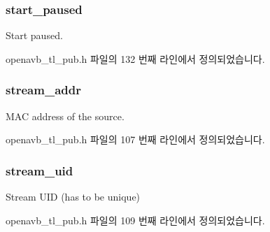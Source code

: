 \subsubsection[{\texorpdfstring{start\+\_\+paused}{start_paused}}]{ start\+\_\+paused}\hypertarget{structopenavb__tl__cfg__t_a0983af523b1f3fd4392c902ccf862905}{}\label{structopenavb__tl__cfg__t_a0983af523b1f3fd4392c902ccf862905}


Start paused. 



openavb\+\_\+tl\+\_\+pub.\+h 파일의 132 번째 라인에서 정의되었습니다.

\subsubsection[{\texorpdfstring{stream\+\_\+addr}{stream_addr}}]{ stream\+\_\+addr}\hypertarget{structopenavb__tl__cfg__t_aad445ea3a27a465a885b5d56648ad282}{}\label{structopenavb__tl__cfg__t_aad445ea3a27a465a885b5d56648ad282}


M\+AC address of the source. 



openavb\+\_\+tl\+\_\+pub.\+h 파일의 107 번째 라인에서 정의되었습니다.

\subsubsection[{\texorpdfstring{stream\+\_\+uid}{stream_uid}}]{ stream\+\_\+uid}\hypertarget{structopenavb__tl__cfg__t_a511b2a26fe61b945ced1dd0bab9f2d1b}{}\label{structopenavb__tl__cfg__t_a511b2a26fe61b945ced1dd0bab9f2d1b}


Stream U\+ID (has to be unique) 



openavb\+\_\+tl\+\_\+pub.\+h 파일의 109 번째 라인에서 정의되었습니다.

